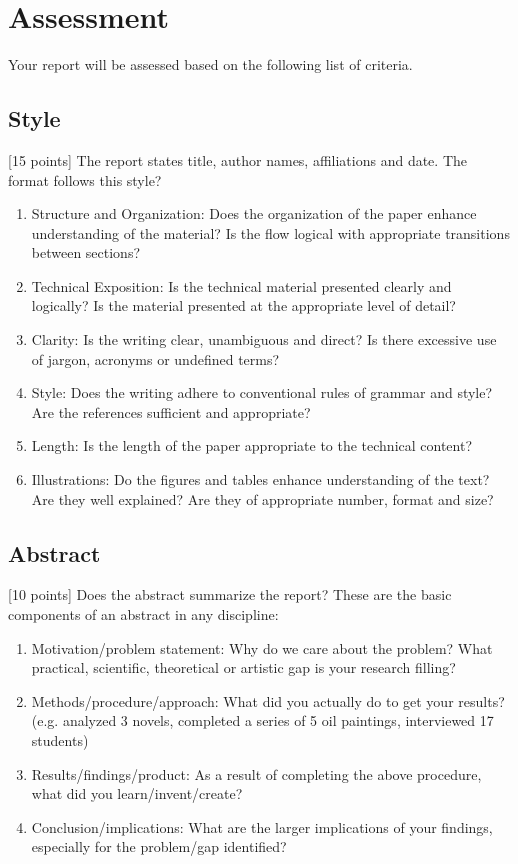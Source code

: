 \documentclass{winslabreport}
\begin{document}
\section{Assessment}

Your report will be assessed based on the following list of criteria.


\subsection{Style}
[15 points] The report states  title, author names, affiliations and date. The format follows this style?

\begin{enumerate}
    \item Structure and Organization: Does the organization of the paper enhance understanding of the material? Is the flow logical with appropriate transitions between sections?
    \item Technical Exposition: Is the technical material presented clearly and logically? Is the material presented at the appropriate level of detail?
    \item  Clarity: Is the writing clear, unambiguous and direct? Is there excessive use of jargon, acronyms or undefined terms?
    \item Style: Does the writing adhere to conventional rules of grammar and style? Are the references sufficient and appropriate?
    \item Length: Is the length of the paper appropriate to the technical content?
    \item Illustrations: Do the figures and tables enhance understanding of the text? Are they well explained? Are they of appropriate number, format and size?
\end{enumerate}


\subsection{Abstract}
[10 points] Does the abstract summarize the report? These are the basic components of an abstract in any discipline:

\begin{enumerate}
    \item Motivation/problem statement: Why do we care about the problem? What practical, scientific, theoretical or artistic gap is your research filling?
    \item  Methods/procedure/approach: What did you actually do to get your results? (e.g. analyzed 3 novels, completed a series of 5 oil paintings, interviewed 17 students)
    \item Results/findings/product: As a result of completing the above procedure, what did you learn/invent/create?
    \item Conclusion/implications: What are the larger implications of your findings, especially for the problem/gap identified?
\end{enumerate}
\end{document}
